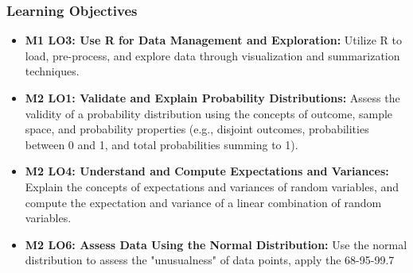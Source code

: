 \begin{frame}
    \frametitle{Learning Objectives}
    \begin{itemize}
        \item \textbf{M1 LO3: Use R for Data Management and Exploration:} Utilize R to load, pre-process, and explore data through visualization and summarization techniques.
        \item \textbf{M2 LO1: Validate and Explain Probability Distributions:} Assess the validity of a probability distribution using the concepts of outcome, sample space, and probability properties (e.g., disjoint outcomes, probabilities between 0 and 1, and total probabilities summing to 1).
        \item \textbf{M2 LO4: Understand and Compute Expectations and Variances:} Explain the concepts of expectations and variances of random variables, and compute the expectation and variance of a linear combination of random variables.
        \item \textbf{M2 LO6: Assess Data Using the Normal Distribution:} Use the normal distribution to assess the "unusualness" of data points, apply the 68-95-99.7%
    \end{itemize}
\end{frame}


